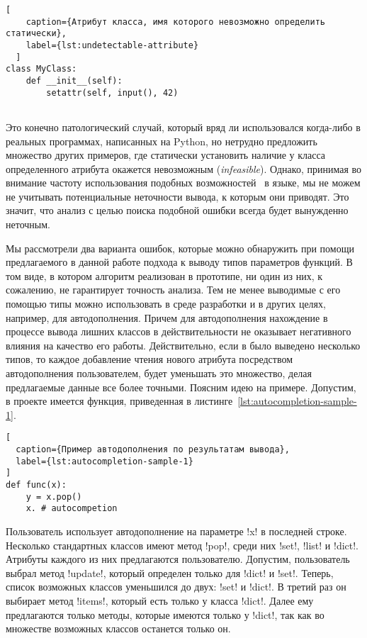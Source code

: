 \begin{description}
  \begin{lstlisting}[
    caption={Атрибут класса, имя которого невозможно определить статически},
    label={lst:undetectable-attribute}
  ]
class MyClass:
    def __init__(self):
        setattr(self, input(), 42)
      
  \end{lstlisting} Это конечно патологический случай, который вряд ли
  использовался когда-либо в реальных программах, написанных на Python, но
  нетрудно предложить множество других примеров, где статически установить
  наличие у класса определенного атрибута окажется невозможным
  (\emph{infeasible}).  Однако, принимая во внимание частоту использования
  подобных возможностей~\cite{Holkner2009} в языке, мы не можем не учитывать
  потенциальные неточности вывода, к которым они приводят. Это значит, что
  анализ с целью поиска подобной ошибки всегда будет вынужденно неточным.

\end{description}

Мы рассмотрели два варианта ошибок, которые можно обнаружить при помощи
предлагаемого в данной работе подхода к выводу типов параметров функций.  В том
виде, в котором алгоритм реализован в прототипе, ни один из них, к сожалению, не
гарантирует точность анализа. Тем не менее выводимые с его помощью типы можно
использовать в среде разработки и в других целях, например, для автодополнения.
Причем для автодополнения нахождение в процессе вывода лишних классов в
действительности не оказывает негативного влияния на качество его работы.
Действительно, если в было выведено несколько типов, то каждое
добавление чтения нового атрибута посредством автодополнения пользователем,
будет уменьшать это множество, делая предлагаемые данные все более точными.
Поясним идею на примере. Допустим, в проекте имеется функция, приведенная в
листинге~\ref{lst:autocompletion-sample-1}. 

\begin{lstlisting}[
  caption={Пример автодополнения по результатам вывода},
  label={lst:autocompletion-sample-1}
]
def func(x):
    y = x.pop()
    x. # autocompetion
\end{lstlisting}

Пользователь использует автодополнение на параметре !x! в последней строке.
Несколько стандартных классов имеют метод !pop!, среди них !set!, !list! и
!dict!. Атрибуты каждого из них предлагаются пользователю. Допустим,
пользователь выбрал метод !update!, который определен только для !dict! и
!set!. Теперь, список возможных классов уменьшился до двух: !set! и
!dict!. В третий раз он выбирает метод !items!, который есть только у класса
!dict!.  Далее ему предлагаются только методы, которые имеются только у !dict!,
так как во множестве возможных классов останется только он.

